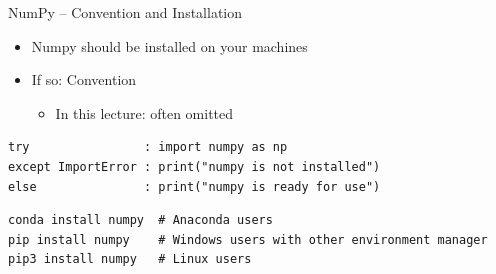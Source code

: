 
\begin{frame}[fragile]{NumPy -- Convention and Installation}
%
\begin{itemize}
\item Numpy should be installed on your machines
\item If so: Convention  
	\begin{itemize}
	\item In this lecture: often omitted
	\end{itemize}
\end{itemize}
%
\begin{codebox}
\begin{verbatim}
try                : import numpy as np
except ImportError : print("numpy is not installed")
else               : print("numpy is ready for use")
\end{verbatim}
\end{codebox}
%
\begin{cmdbox}[Install]
\begin{verbatim}
conda install numpy  # Anaconda users
pip install numpy    # Windows users with other environment manager
pip3 install numpy   # Linux users
\end{verbatim}
\end{cmdbox}
%
\end{frame}


